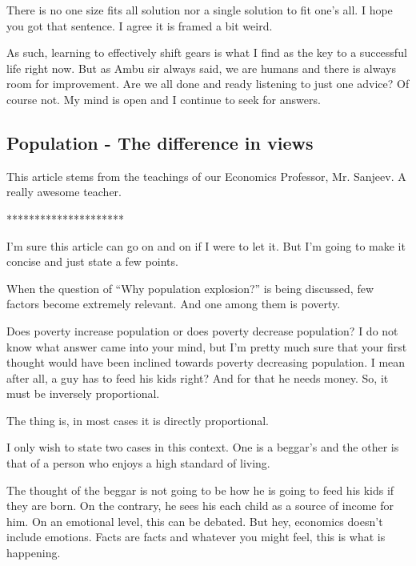 \documentclass[twoside,11pt,titlepage]{article}
\begin{document}
There is no one size fits all solution nor a single solution to fit one's all. I hope you got that sentence. I agree it is framed a bit weird.

As such, learning to effectively shift gears is what I find as the key to a successful life right now. But as Ambu sir always said, we are humans and there is always room for improvement. Are we all done and ready listening to just one advice? Of course not. My mind is open and I continue to seek for answers.

\newpage
\begin{center}
  \section{Population - The difference in views}
\end{center}
\bigskip
\bigskip
\bigskip

This article stems from the teachings of our Economics Professor, Mr. Sanjeev. A really awesome teacher.

\bigskip
\begin{center}
*********************
\end{center}

I'm sure this article can go on and on if I were to let it. But I'm going to make it concise and just state a few points.

When the question of ``Why population explosion?'' is being discussed, few factors become extremely relevant. And one among them is poverty.

Does poverty increase population or does poverty decrease population? I do not know what answer came into your mind, but I'm pretty much sure that your first thought would have been inclined towards poverty decreasing population. I mean after all, a guy has to feed his kids right? And for that he needs money. So, it must be inversely proportional.

The thing is, in most cases it is directly proportional.

I only wish to state two cases in this context. One is a beggar's and the other is that of a person who enjoys a high standard of living.

The thought of the beggar is not going to be how he is going to feed his kids if they are born. On the contrary, he sees his each child as a source of income for him. On an emotional level, this can be debated. But hey, economics doesn't include emotions. Facts are facts and whatever you might feel, this is what is happening.
\end{document}
